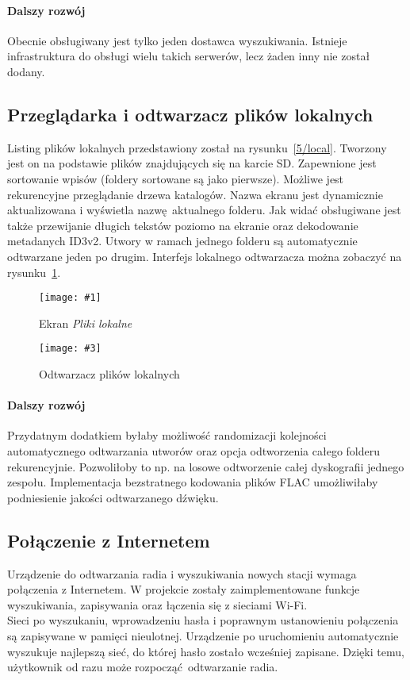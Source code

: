 \documentclass[polish]{aghengthesis}
\newcommand{\imgintss}[5]{
	\begin{figure}[{#5}]
		\centering
		\begin{minipage}{.45\textwidth}
			\centering
			\texttt{[image: \#1]}
			\caption{#2}
			\label{#1}
		\end{minipage}%
		\hfill
		\begin{minipage}{.45\textwidth}
			\centering
			\texttt{[image: \#3]}
			\caption{#4}
			\label{#3}
		\end{minipage}
	\end{figure}
}
\newcommand{\imghss}[4]{\imgintss{#1}{#2}{#3}{#4}{H}}
\begin{document}
			\paragraph{Dalszy rozwój}
				Obecnie obsługiwany jest tylko jeden dostawca wyszukiwania. Istnieje infrastruktura do obsługi wielu takich serwerów, lecz żaden inny nie został dodany.
			
		\subsection{Przeglądarka i odtwarzacz plików lokalnych}
			Listing plików lokalnych przedstawiony został na rysunku~\ref{5/local}. Tworzony jest on na podstawie plików znajdujących się na karcie SD. Zapewnione jest sortowanie wpisów (foldery sortowane są jako pierwsze). Możliwe jest rekurencyjne przeglądanie drzewa katalogów. Nazwa ekranu jest dynamicznie aktualizowana i wyświetla nazwę aktualnego folderu. Jak widać obsługiwane jest także przewijanie długich tekstów poziomo na ekranie oraz dekodowanie metadanych ID3v2. Utwory w ramach jednego folderu są automatycznie odtwarzane jeden po drugim. Interfejs lokalnego odtwarzacza można zobaczyć na rysunku~\ref{5/local_play}.
			
			\imghss{5/local}{Ekran \textit{Pliki lokalne}}{5/local_play}{Odtwarzacz plików lokalnych}
			
			\paragraph{Dalszy rozwój}
				Przydatnym dodatkiem byłaby możliwość randomizacji kolejności automatycznego odtwarzania utworów oraz opcja odtworzenia całego folderu rekurencyjnie. Pozwoliłoby to np. na losowe odtworzenie całej dyskografii jednego zespołu. Implementacja bezstratnego kodowania plików FLAC umożliwiłaby podniesienie jakości odtwarzanego dźwięku.
		
		\subsection{Połączenie z Internetem}
			Urządzenie do odtwarzania radia i wyszukiwania nowych stacji wymaga połączenia z Internetem. W projekcie zostały zaimplementowane funkcje wyszukiwania, zapisywania oraz łączenia się z sieciami Wi-Fi.
			$ $\\
			
			Sieci po wyszukaniu, wprowadzeniu hasła i poprawnym ustanowieniu połączenia są zapisywane w pamięci nieulotnej. Urządzenie po uruchomieniu automatycznie wyszukuje najlepszą sieć, do której hasło zostało wcześniej zapisane. Dzięki temu, użytkownik od razu może rozpocząć odtwarzanie radia.
	
\end{document}
